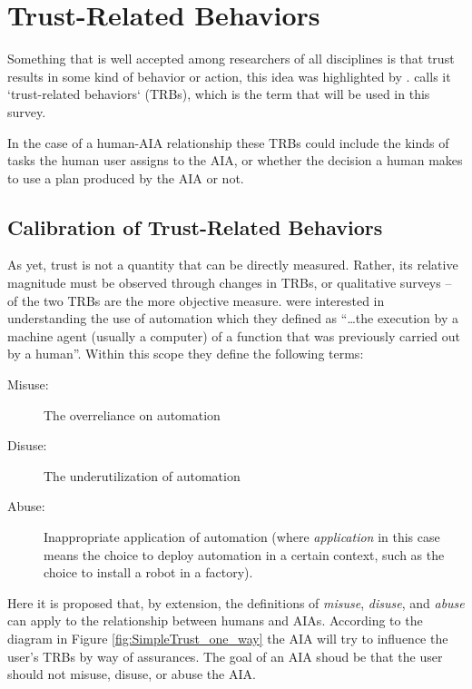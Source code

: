 \section{Trust-Related Behaviors} \label{sec:trbs}
Something that is well accepted among researchers of all disciplines is that trust results in some kind of behavior or action, this idea was highlighted by \citet{Lewis1985-pr}.  \citet{McKnight2001-fa} calls it `trust-related behaviors` (TRBs), which is the term that will be used in this survey.

In the case of a human-AIA relationship these TRBs could include the kinds of tasks the human user assigns to the AIA, or whether the decision a human makes to use a plan produced by the AIA or not. 

\subsection{Calibration of Trust-Related Behaviors}
    As yet, trust is not a quantity that can be directly measured. Rather, its relative magnitude must be observed through changes in TRBs, or qualitative surveys -- of the two TRBs are the more objective measure. \citet{Parasuraman1997-co} were interested in understanding the use of automation which they defined as ``\ldots the execution by a machine agent (usually a computer) of a function that was previously carried out by a human''. Within this scope they define the following terms:
    
    \begin{description}
        \item [Misuse:] The overreliance on automation
        \item [Disuse:] The underutilization of automation
        \item [Abuse:] Inappropriate application of automation (where \emph{application} in this case means the choice to deploy automation in a certain context, such as the choice to install a robot in a factory).
    \end{description}

    Here it is proposed that, by extension, the definitions of \emph{misuse}, \emph{disuse}, and \emph{abuse} can apply to the relationship between humans and AIAs. According to the diagram in Figure \ref{fig:SimpleTrust_one_way} the AIA will try to influence the user's TRBs by way of assurances. The goal of an AIA shoud be that the user should not misuse, disuse, or abuse the AIA.
    
